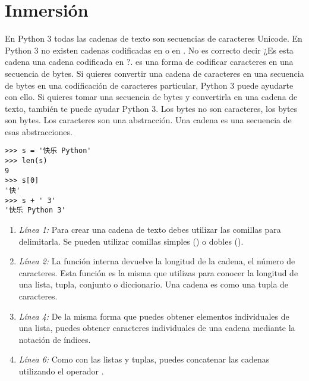 \section{Inmersión}

En Python 3 todas las cadenas de texto son secuencias de caracteres Unicode. En Python 3 no existen cadenas codificadas en  o en . No es correcto decir ¿Es esta cadena una cadena codificada en ?.  es una forma de codificar caracteres en una secuencia de bytes. Si quieres convertir una cadena de caracteres en una secuencia de bytes en una codificación de caracteres particular, Python 3 puede ayudarte con ello. Si quieres tomar una secuencia de bytes y convertirla en una cadena de texto, también te puede ayudar Python 3. Los bytes no son caracteres, los bytes son bytes. Los caracteres son una abstracción. Una cadena es una secuencia de esas abstracciones.

\noindent\begin{minipage}{\textwidth}
\begin{lstlisting}[mathescape=True,escapeinside=@@]
>>> s = '快乐 Python'
>>> len(s)
9
>>> s[0]
'快'
>>> s + ' 3'
'快乐 Python 3'
\end{lstlisting}
\end{minipage}

\begin{enumerate}

\item \emph{Línea 1:} Para crear una cadena de texto debes utilizar las comillas para delimitarla. Se pueden utilizar comillas simples () o dobles ().

\item \emph{Línea 2:} La función interna  devuelve la longitud de la cadena, el número de caracteres. Esta función es la misma que utilizas para conocer la longitud de una lista, tupla, conjunto o diccionario. Una cadena es como una tupla de caracteres.

\item \emph{Línea 4:} De la misma forma que puedes obtener elementos individuales de una lista, puedes obtener caracteres individuales de una cadena mediante la notación de índices.

\item \emph{Línea 6:} Como con las listas y tuplas, puedes concatenar las cadenas utilizando el operador \codigo{+}.

\end{enumerate}


